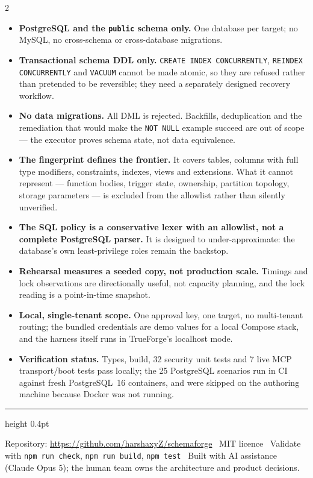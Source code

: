 \documentclass[8pt,a4paper]{extarticle}
\newcommand{\code}[1]{\texttt{\small #1}}
\begin{document}
\begin{multicols}{2}
\begin{itemize}
  \item \textbf{PostgreSQL and the \code{public} schema only.} One database per target; no MySQL, no cross-schema or cross-database migrations.
  \item \textbf{Transactional schema DDL only.} \code{CREATE INDEX CONCURRENTLY}, \code{REINDEX CONCURRENTLY} and \code{VACUUM} cannot be made atomic, so they are refused rather than pretended to be reversible; they need a separately designed recovery workflow.
  \item \textbf{No data migrations.} All DML is rejected. Backfills, deduplication and the remediation that would make the \code{NOT NULL} example succeed are out of scope --- the executor proves schema state, not data equivalence.
  \item \textbf{The fingerprint defines the frontier.} It covers tables, columns with full type modifiers, constraints, indexes, views and extensions. What it cannot represent --- function bodies, trigger state, ownership, partition topology, storage parameters --- is excluded from the allowlist rather than silently unverified.
  \item \textbf{The SQL policy is a conservative lexer with an allowlist, not a complete PostgreSQL parser.} It is designed to under-approximate: the database's own least-privilege roles remain the backstop.
  \item \textbf{Rehearsal measures a seeded copy, not production scale.} Timings and lock observations are directionally useful, not capacity planning, and the lock reading is a point-in-time snapshot.
  \item \textbf{Local, single-tenant scope.} One approval key, one target, no multi-tenant routing; the bundled credentials are demo values for a local Compose stack, and the harness itself runs in TrueForge's localhost mode.
  \item \textbf{Verification status.} Types, build, 32 security unit tests and 7 live MCP transport/boot tests pass locally; the 25 PostgreSQL scenarios run in CI against fresh PostgreSQL~16 containers, and were skipped on the authoring machine because Docker was not running.
\end{itemize}
\end{multicols}

\vfill
{\color{sfrule}\hrule height 0.4pt}
\vspace{0.5ex}
{\footnotesize Repository: \url{https://github.com/harshaxyZ/schemaforge} \textperiodcentered\ MIT licence \textperiodcentered\ Validate with
\code{npm run check}, \code{npm run build}, \code{npm test} \textperiodcentered\ Built with AI assistance (Claude Opus 5);
the human team owns the architecture and product decisions.}
\end{document}
